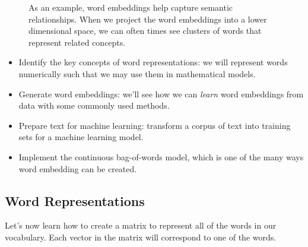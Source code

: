 \documentclass[12pt]{article}
\begin{document}
\begin{figure}[h]
  \begin{center}
  \caption{As an example, word embeddings help capture semantic relationships. When we project the word embeddings into a lower dimensional space, we can often times see clusters of words that represent related concepts.} 
  \end{center}
\end{figure}

\begin{itemize}
  \item Identify the key concepts of word representations: we will represent     words numerically such that we may use them in mathematical models.
\item Generate word embeddings: we'll see how we can \emph{learn} word   embeddings from data with some commonly used methods.
\item Prepare text for machine learning: transform a corpus of text into   training sets for a machine learning model.
\item Implement the continuous bag-of-words model, which is one of the many ways word embedding can be created.
\end{itemize}

\subsection{Word Representations} Let's now learn how to create a matrix to represent all of the words in our vocabulary. Each vector in the matrix will correspond to one of the words.
\end{document}
